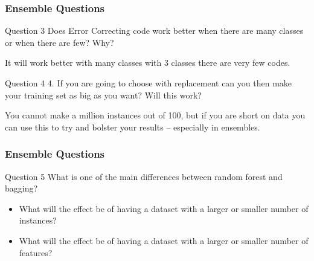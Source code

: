 \documentclass[aspectratio=169, 10pt]{beamer}
\begin{document}
\begin{frame}
    \frametitle{Ensemble Questions}
    \begin{block}{Question 3}
        Does Error Correcting code work better when there are many classes or when there are few? Why? 
    \end{block}

    It will work better with many classes with 3 classes there are very few codes.

    \begin{block}{Question 4}
        4.	If you are going to choose with replacement can you then make your training set as big as you want? Will this work? 
    \end{block}

    You cannot make a million instances out of 100, but if you are short on data you can use this to try and bolster your results – especially in ensembles.

\end{frame}

\begin{frame}
    \frametitle{Ensemble Questions}
    \begin{block}{Question 5}
        What is one of the main differences between random forest and bagging?
        \begin{itemize}
            \item What will the effect be of having a dataset with a larger or smaller number of instances?\\
            \item What will the effect be of having a dataset with a larger or smaller number of features?\\
        \end{itemize}
    \end{block}

\end{frame}
\end{document}
